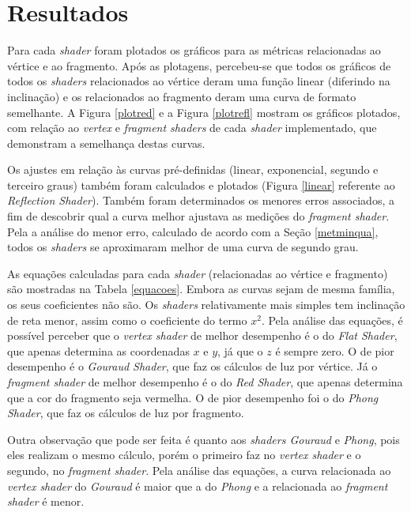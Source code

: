 \chapter[Resultados]{Resultados}
\label{result}

	Para cada \textit{shader} foram plotados os gráficos para as métricas relacionadas ao vértice e ao fragmento. Após as plotagens, percebeu-se que todos os gráficos de todos os \textit{shaders} relacionados ao vértice deram uma função linear (diferindo na inclinação) e os relacionados ao fragmento deram uma curva de formato semelhante. A Figura \ref{plotred} e a Figura \ref{plotrefl} mostram os gráficos plotados, com relação ao \textit{vertex} e \textit{fragment shaders} de cada \textit{shader} implementado, que demonstram a semelhança destas curvas.

	 Os ajustes em relação às curvas pré-definidas (linear, exponencial, segundo e terceiro graus) também foram calculados e plotados (Figura \ref{linear} referente ao \textit{Reflection Shader}). Também foram determinados os menores erros associados, a fim de descobrir qual a curva melhor ajustava as medições do \textit{fragment shader}. Pela a análise do menor erro, calculado de acordo com a Seção \ref{metminqua}, todos os \textit{shaders} se aproximaram melhor de uma curva de segundo grau.

	As equações calculadas para cada \textit{shader} (relacionadas ao vértice e fragmento) são mostradas na Tabela \ref{equacoes}. Embora as curvas sejam de mesma família, os seus coeficientes não são. Os \textit{shaders} relativamente mais simples tem inclinação de reta menor, assim como o coeficiente do termo $x^2$. Pela análise das equações, é possível perceber que o \textit{vertex shader} de melhor desempenho é o do \textit{Flat Shader}, que apenas determina as coordenadas $x$ e $y$, já que o $z$ é sempre zero. O de pior desempenho é o \textit{Gouraud Shader}, que faz os cálculos de luz por vértice. Já o \textit{fragment shader} de melhor desempenho é o do \textit{Red Shader}, que apenas determina que a cor do fragmento seja vermelha. O de pior desempenho foi o do \textit{Phong Shader}, que faz os cálculos de luz por fragmento.

	Outra observação que pode ser feita é quanto aos \textit{shaders Gouraud} e \textit{Phong}, pois eles realizam o mesmo cálculo, porém o primeiro faz no \textit{vertex shader} e o segundo, no \textit{fragment shader}. Pela análise das equações, a curva relacionada ao \textit{vertex shader} do \textit{Gouraud} é maior que a do \textit{Phong} e a relacionada ao \textit{fragment shader} é menor. 

